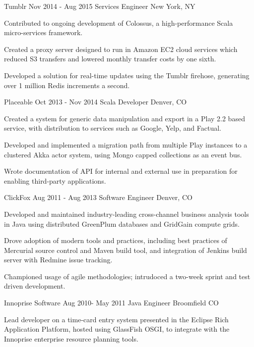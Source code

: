 \documentclass[10pt]{article}
\begin{document}
{	\job
	{Tumblr}
	{Nov 2014 - Aug 2015}
	{Services Engineer}
	{New York, NY}
	{
	\begin{newitemize}
		\item Contributed to ongoing development of Colossus, a
	high-performance Scala micro-services
	framework.
		\item Created a proxy server designed to run in Amazon EC2 cloud
		services which reduced S3 transfers and lowered monthly transfer
		costs by one sixth.
		\item Developed a solution for real-time updates using the
		Tumblr firehose, generating over 1 million Redis increments a
		second.
	\end{newitemize}
	}

	\job
	{Placeable}
	{Oct 2013 - Nov 2014}
	{Scala Developer}
	{Denver, CO}
	{
	\begin{newitemize}
		\item Created a system for generic data manipulation and export
in a Play 2.2 based service, with distribution to services such
as Google, Yelp, and Factual.
		\item Developed and implemented a migration path from multiple
Play instances to a clustered Akka actor system, using Mongo
capped collections as an event bus.
		\item Wrote documentation of API for internal and external use
in preparation for enabling third-party applications.
	\end{newitemize}
	}

	\job
	{ClickFox}
	{Aug 2011 - Aug 2013}
	{Software Engineer}
	{Denver, CO}
	{
	\begin{newitemize}
		\item Developed and maintained industry-leading cross-channel business analysis tools in Java using distributed GreenPlum databases and GridGain compute grids.
		\item Drove adoption of modern tools and practices, including
best practices of Mercurial source control and Maven build tool,
and integration of Jenkins build server with Redmine issue
tracking.
		\item Championed usage of agile methodologies; intrudoced a
two-week sprint and test driven development.
	\end{newitemize}
	}

	\job
	{Innoprise Software}
	{Aug 2010- May 2011}
	{Java Engineer}
	{Broomfield CO}
	{
	\begin{newitemize}
		\item Lead developer on a time-card entry system presented in
the Eclipse Rich Application Platform, hosted using GlassFish
OSGI, to integrate with the Innoprise enterprise resource
planning tools.
	\end{newitemize}
	}

}
\end{document}
